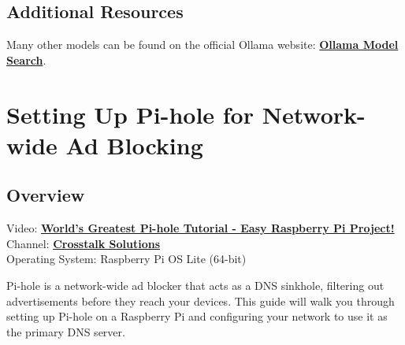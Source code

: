 \documentclass[a4paper,12pt]{article}
\begin{document}
\subsection{Additional Resources}
Many other models can be found on the official Ollama website: \href{https://ollama.com/search}{\textbf{\color{blue}Ollama Model Search}}.

\section{Setting Up Pi-hole for Network-wide Ad Blocking}

\subsection{Overview}
Video: \href{https://www.youtube.com/watch?v=cE21YjuaB6o}{\textbf{\color{blue}World's Greatest Pi-hole Tutorial - Easy Raspberry Pi Project!}} \\
Channel: \href{https://www.youtube.com/@CrosstalkSolutions}{\textbf{\color{blue}Crosstalk Solutions}} \\
Operating System: Raspberry Pi OS Lite (64-bit)

Pi-hole is a network-wide ad blocker that acts as a DNS sinkhole, filtering out advertisements before they reach your devices. This guide will walk you through setting up Pi-hole on a Raspberry Pi and configuring your network to use it as the primary DNS server.
\end{document}
